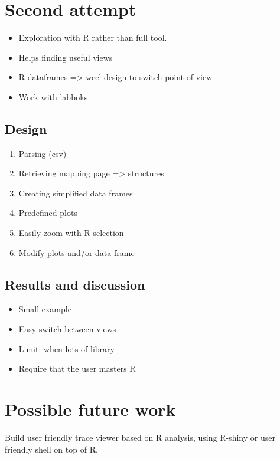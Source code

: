 \section{Second attempt}

\begin{itemize}
    \item Exploration with R rather than full tool.
    \item Helps finding useful views
    \item R dataframes => weel design to switch point of view
    \item Work with labboks 
\end{itemize}

\subsection{Design}

\begin{enumerate}
    \item Parsing (csv)
    \item Retrieving mapping page => structures
    \item Creating simplified data frames
    \item Predefined plots
    \item Easily zoom  with R selection
    \item Modify plots and/or data frame
\end{enumerate}

\subsection{Results and discussion}

\begin{itemize}
    \item Small example
    \item Easy switch between views
    \item Limit: when lots of library
    \item Require that the user masters R
\end{itemize}

\section{Possible future work}

Build user friendly trace viewer based on R analysis, using R-shiny or user friendly shell on top of R.

